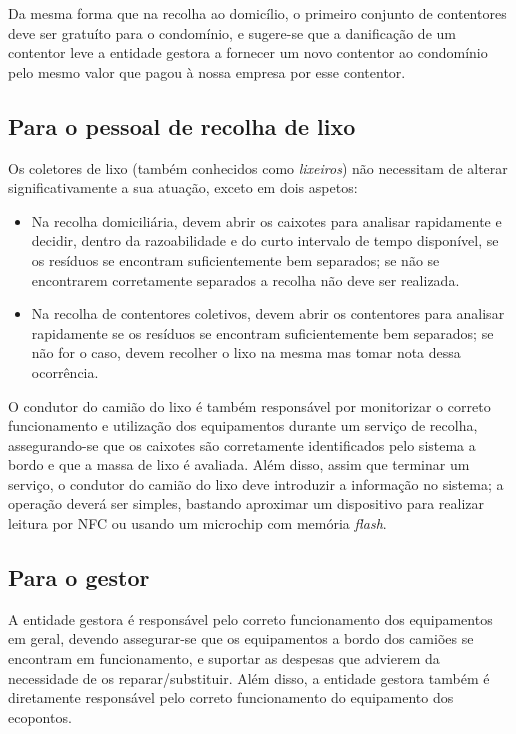 \documentclass[11pt, a4paper, oneside]{book}
\begin{document}
Da mesma forma que na recolha ao domicílio, o primeiro conjunto de contentores deve ser gratuíto para o condomínio, e sugere-se que a danificação de um contentor leve a entidade gestora a fornecer um novo contentor ao condomínio pelo mesmo valor que pagou à nossa empresa por esse contentor.

\subsection{Para o pessoal de recolha de lixo}

Os coletores de lixo (também conhecidos como \textit{lixeiros}) não necessitam de alterar significativamente a sua atuação, exceto em dois aspetos:

\begin{itemize}
    \item Na recolha domiciliária, devem abrir os caixotes para analisar rapidamente e decidir, dentro da razoabilidade e do curto intervalo de tempo disponível, se os resíduos se encontram suficientemente bem separados; se não se encontrarem corretamente separados a recolha não deve ser realizada.
    \item Na recolha de contentores coletivos, devem abrir os contentores para analisar rapidamente se os resíduos se encontram suficientemente bem separados; se não for o caso, devem recolher o lixo na mesma mas tomar nota dessa ocorrência.
\end{itemize}

O condutor do camião do lixo é também responsável por monitorizar o correto funcionamento e utilização dos equipamentos durante um serviço de recolha, assegurando-se que os caixotes são corretamente identificados pelo sistema a bordo e que a massa de lixo é avaliada. Além disso, assim que terminar um serviço, o condutor do camião do lixo deve introduzir a informação no sistema; a operação deverá ser simples, bastando aproximar um dispositivo para realizar leitura por NFC ou usando um microchip com memória \textit{flash}.

\subsection{Para o gestor}

A entidade gestora é responsável pelo correto funcionamento dos equipamentos em geral, devendo assegurar-se que os equipamentos a bordo dos camiões se encontram em funcionamento, e suportar as despesas que advierem da necessidade de os reparar/substituir. Além disso, a entidade gestora também é diretamente responsável pelo correto funcionamento do equipamento dos ecopontos.
\end{document}
